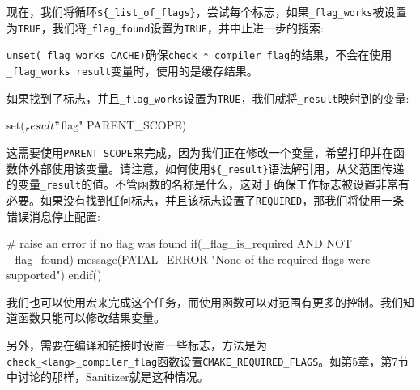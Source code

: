 现在，我们将循环\texttt{\$\{\_list\_of\_flags\}}，尝试每个标志，如果\texttt{\_flag\_works}被设置为\texttt{TRUE}，我们将\texttt{\_flag\_found}设置为\texttt{TRUE}，并中止进一步的搜索:


\texttt{unset(\_flag\_works CACHE)}确保\texttt{check\_*\_compiler\_flag}的结果，不会在使用\texttt{\_flag\_works result}变量时，使用的是缓存结果。

如果找到了标志，并且\texttt{\_flag\_works}设置为\texttt{TRUE}，我们就将\texttt{\_result}映射到的变量:

\begin{codebox}[cmake]
set(${_result} "${flag}" PARENT_SCOPE)
\end{codebox}

这需要使用\texttt{PARENT\_SCOPE}来完成，因为我们正在修改一个变量，希望打印并在函数体外部使用该变量。请注意，如何使用\texttt{\$\{\_result\}}语法解引用，从父范围传递的变量\texttt{\_result}的值。不管函数的名称是什么，这对于确保工作标志被设置非常有必要。如果没有找到任何标志，并且该标志设置了\texttt{REQUIRED}，那我们将使用一条错误消息停止配置:

\begin{codebox}[cmake]
# raise an error if no flag was found
if(_flag_is_required AND NOT _flag_found)
    message(FATAL_ERROR "None of the required flags were supported")
endif() 
\end{codebox}


我们也可以使用宏来完成这个任务，而使用函数可以对范围有更多的控制。我们知道函数只能可以修改结果变量。

另外，需要在编译和链接时设置一些标志，方法是为\texttt{check\_<lang>\_compiler\_flag}函数设置\texttt{CMAKE\_REQUIRED\_FLAGS}。如第5章，第7节中讨论的那样，Sanitizer就是这种情况。


